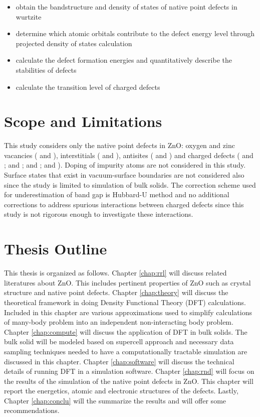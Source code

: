 \begin{itemize}
	\item obtain the bandstructure and density of states of native point defects in wurtzite 
	\item determine which atomic orbitals  contribute to the defect energy level through projected density of states calculation
	\item calculate the defect formation energies and quantitatively describe the stabilities of defects
	\item calculate the transition level of charged defects
\end{itemize}

\section{Scope and Limitations}
This study considers only the native point defects in ZnO: oxygen and zinc vacancies ( and ), interstitials ( and ), antisites ( and ) and charged defects ( and ;  and ;  and ;  and ). Doping of impurity atoms are not considered in this study. Surface states that exist in vacuum-surface boundaries are not considered also since the study is limited to simulation of bulk solids. The correction scheme used for underestimation of band gap is Hubbard-U method and no additional corrections to address spurious interactions between charged defects since this study is not rigorous enough to investigate these interactions.


\section{Thesis Outline}
This thesis is organized as follows. Chapter \ref{chap:rrl} will discuss related literatures about ZnO. This includes pertinent properties of ZnO such as crystal structure and native point defects. Chapter \ref{chap:theory} will discuss the theoretical framework in doing Density Functional Theory (DFT) calculations. Included in this chapter are various approximations used to simplify calculations of many-body problem into an independent non-interacting body problem. Chapter \ref{chap:compute} will discuss the application of DFT in bulk solids. The bulk solid will be modeled based on supercell approach and necessary data sampling techniques needed to have a computationally tractable simulation are discussed in this chapter. Chapter \ref{chap:software} will discuss the technical details of running DFT in a simulation software. Chapter \ref{chap:rnd} will focus on the results of the simulation of the native point defects in ZnO. This chapter will report the energetics, atomic and electronic structures of the defects. Lastly, Chapter \ref{chap:conclu} will the summarize the results and will offer some recommendations.

